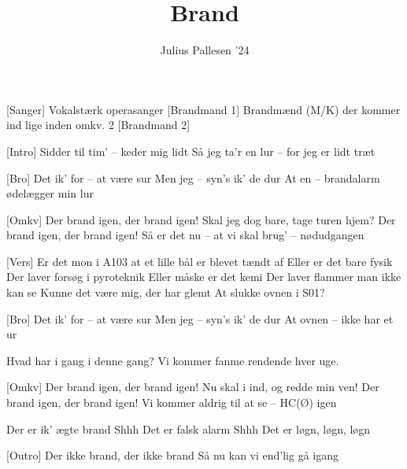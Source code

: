 \documentclass[a4paper,11pt]{article}
\title{Brand}
\author{Julius Pallesen '24}
\begin{document}
\maketitle

\begin{roles}
[Sanger] Vokalstærk operasanger
[Brandmand 1] Brandmænd (M/K) der kommer ind lige inden omkv. 2
[Brandmand 2]
\end{roles}

\begin{song}
    [Intro] Sidder til tim' – keder mig lidt
Så jeg ta'r en lur – for jeg er lidt træt

[Bro] Det ik' for – at være sur
Men jeg – syn's ik' de dur
At en – brandalarm ødelægger min lur

[Omkv] Der brand igen, der brand igen!
Skal jeg dog bare, tage turen hjem?
Der brand igen, der brand igen!
Så er det nu – at vi skal brug' – nødudgangen


[Vers] Er det mon i A103
at et lille bål er blevet tændt af
Eller er det bare fysik
Der laver forsøg i pyroteknik
Eller måske er det kemi
Der laver flammer man ikke kan se
Kunne det være mig, der har glemt
At slukke ovnen i S01?

[Bro] Det ik' for – at være sur
Men jeg – syn's ik' de dur
At ovnen – ikke har et ur


 Hvad har i gang i denne gang? Vi kommer fanme rendende hver uge.


[Omkv] 
Der brand igen, der brand igen!
Nu skal i ind, og redde min ven!
Der brand igen, der brand igen!
Vi kommer aldrig til at se – HC(Ø) igen

Der er ik' ægte brand
Shhh
Det er falsk alarm
Shhh
Det er løgn, løgn, løgn


[Outro] Der ikke brand, der ikke brand
Så nu kan vi end'lig gå igang

\end{song}
\end{document}
